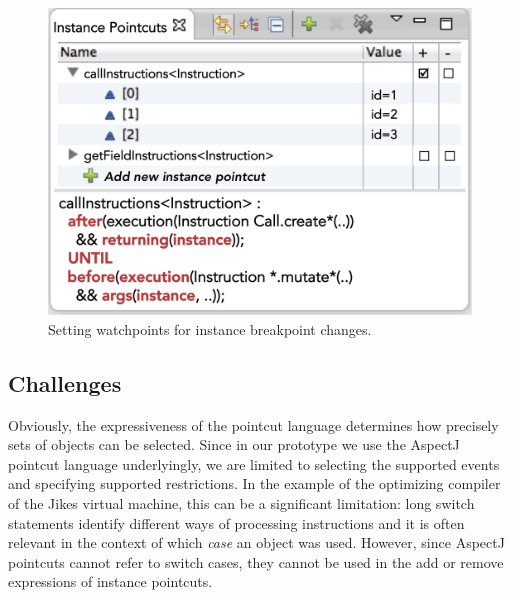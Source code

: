 \begin{figure}
\centering
\includegraphics[scale=0.24]{images/callInstructionsUntil.png}
\caption{Setting watchpoints for instance breakpoint changes.}
\label{fig:ip-watchpoints}
\end{figure}

\subsection{Challenges}
\label{sec:challenges}

Obviously, the expressiveness of the pointcut language determines how precisely sets of objects can be selected.
Since in our prototype we use the AspectJ pointcut language underlyingly, we are limited to selecting the supported events and specifying supported restrictions.
In the example of the optimizing compiler of the Jikes virtual machine, this can be a significant limitation:
long switch statements identify different ways of processing instructions and it is often relevant in the context of which \emph{case} an object was used.
However, since AspectJ pointcuts cannot refer to switch cases, they cannot be used in the add or remove expressions of instance pointcuts.



